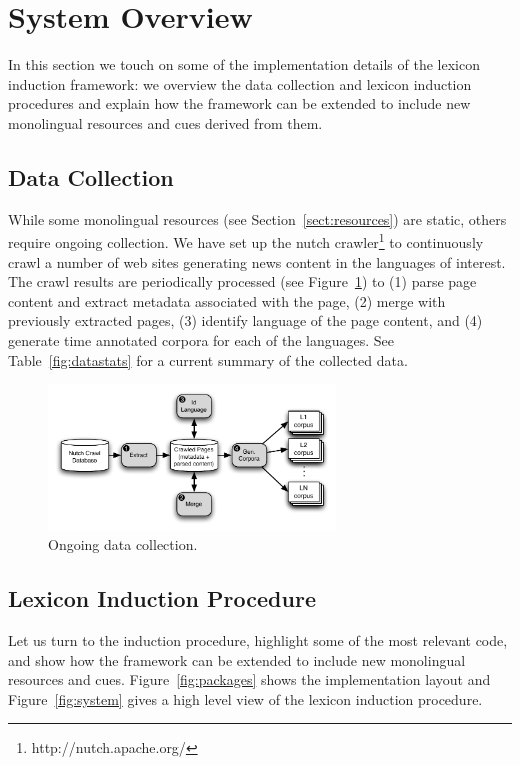 \documentclass{article}
\newcommand{\secref}[1]{Section~\ref{#1}}
\newcommand{\tabref}[1]{Table~\ref{#1}}
\newcommand{\figref}[1]{Figure~\ref{#1}}
\begin{document}
\section{System Overview}

In this section we touch on some of the implementation details of the lexicon induction framework: we overview the data collection and lexicon induction procedures and explain how the framework can be extended to include new monolingual resources and cues derived from them.  

\subsection{Data Collection}

While some monolingual resources (see \secref{sect:resources}) are static, others require ongoing collection.  We have set up the nutch crawler\footnote{http://nutch.apache.org/} to continuously crawl a number of web sites generating news content in the languages of interest.  The crawl results are periodically processed (see \figref{fig:data}) to (1) parse page content and extract metadata associated with the page, (2) merge with previously extracted pages, (3) identify language of the page content, and (4) generate time annotated corpora for each of the languages.  See \tabref{fig:datastats} for a current summary of the collected data.

\begin{figure}[h]
\centerline{\mbox{\includegraphics[width=3in]{figures/datacollect}}}
\caption{Ongoing data collection.}
\label{fig:data}
\end{figure}

\subsection{Lexicon Induction Procedure}

Let us turn to the induction procedure, highlight some of the most relevant code, and show how the framework can be extended to include new monolingual resources and cues.  \figref{fig:packages} shows the implementation layout and \figref{fig:system} gives a high level view of the lexicon induction procedure.\\
\end{document}
